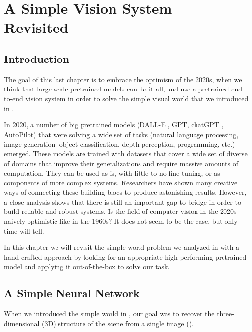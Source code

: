 %	
%	
%	 
%




\chapter{A Simple Vision System---Revisited}
\label{chap:simple_system_revisited}
\section{Introduction}
The goal of this last chapter is to embrace the optimism of the 2020s, when we think that large-scale pretrained models can do it all, and use a pretrained end-to-end vision system in order to solve the simple visual world that we introduced in \chap{\ref{chapter:simplesystem}}.

In 2020, a number of big pretrained models (DALL-E \cite{dalle1}, GPT, chatGPT \cite{openai2023gpt4}, AutoPilot) that were solving a wide set of tasks (natural language processing, image generation, object classification, depth perception, programming, etc.) emerged. These models are trained with datasets that cover a wide set of diverse of domains that improve their generalizations and require massive amounts of computation. They can be used as is, with little to no fine tuning, or as components of more complex systems. Researchers have shown many creative ways of connecting these building blocs to produce astonishing results. However, a close analysis shows that there is still an important gap to bridge in order to build reliable and robust systems. Is the field of computer vision in the 2020s naively optimistic like in the 1960s? It does not seem to be the case, but only time will tell. 

In this chapter we will revisit the simple-world problem we analyzed in \chap{\ref{chapter:simplesystem}} with a hand-crafted approach by looking for an appropriate high-performing pretrained model and applying it out-of-the-box to solve our task.

\section{A Simple Neural Network}

When we introduced the simple world in \chap{\ref{chapter:simplesystem}}, our goal was to recover the three-dimensional (3D) structure of the scene from a single image (\fig{\ref{fig:simplesystem_revisited_img1}}).

